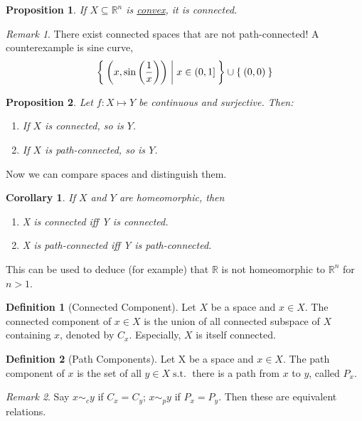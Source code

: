 \documentclass[12pt]{amsart}
\newcommand{\bbR}{\mathbb{R}}
\newcommand{\suchthat}{\operatorname{s.t.}}
\theoremstyle{plain}
\newtheorem*{prop}{Proposition}
\newtheorem*{cor}{Corollary}
\theoremstyle{remark}
\newtheorem*{rmk}{Remark}
\theoremstyle{definition}
\newtheorem*{define}{Definition}
\begin{document}
\begin{prop}
	If $X \subseteq \bbR^n$ is \ul{convex}, it is connected.
\end{prop}

\begin{rmk}
	There exist connected spaces that are not path-connected! A counterexample is sine curve,
	\begin{equation*}
		\Set{\left(x,\sin\left(\frac{1}{x}\right)\right)| x\in (0, 1]} \cup \Set{(0,0)}
	\end{equation*}
\end{rmk}

\begin{prop}
	Let $f: X \mapsto Y$ be continuous and surjective. Then:
	\begin{enumerate}[(1)]
		\item If $X$ is connected, so is $Y$.
		\item If $X$ is path-connected, so is $Y$.
	\end{enumerate}
\end{prop}

Now we can compare spaces and distinguish them.

\begin{cor}
	If $X$ and $Y$ are homeomorphic, then 
	\begin{enumerate}[(1)]
		\item X is connected iff Y is connected.
		\item X is path-connected iff Y is path-connected.
	\end{enumerate}
\end{cor}

This can be used to deduce (for example) that $\bbR$ is not homeomorphic to $\bbR^n$ for $n > 1$.

\begin{define}[Connected Component]
	Let $X$ be a space and $x \in X$. The connected component of $x \in X$ is the union of all connected subspace of $X$ containing $x$, denoted by $C_x$. Especially, $X$ is itself connected.
\end{define}

\begin{define}[Path Components]
	Let X be a space and $x \in X$. The path component of $x$ is the set of all $y\in X \suchthat$ there is a path from $x$ to $y$, called $P_x$.
\end{define}

\begin{rmk}
	Say $x {\sim}_{c} y$ if $C_x = C_y$; 
	\newline
	$x {\sim}_{p} y$ if $P_x = P_y$.
	\newline
	Then these are equivalent relations.
\end{rmk}
\end{document}
